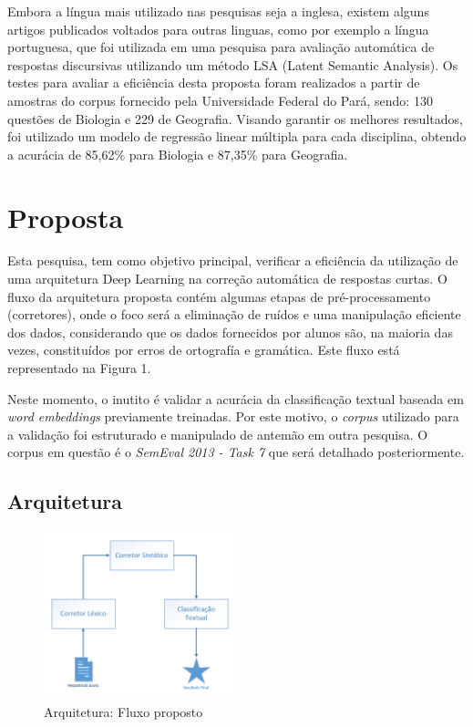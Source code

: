 \documentclass[conference]{IEEEtran}
\begin{document}
Embora a língua mais utilizado nas pesquisas seja a inglesa, existem alguns artigos publicados voltados para outras linguas, como por exemplo a língua portuguesa, que foi utilizada em uma pesquisa para avaliação automática de respostas discursivas  utilizando um método LSA (Latent Semantic Analysis)\cite{Sukkarieh:2009}. Os testes para avaliar a eficiência desta proposta foram realizados a partir de amostras do corpus fornecido pela Universidade Federal do Pará, sendo: 130 questões de Biologia e 229 de Geografia. Visando garantir os melhores resultados, foi utilizado um modelo de regressão linear múltipla para cada disciplina, obtendo a acurácia de 85,62\% para Biologia e 87,35\% para Geografia.

\section{Proposta}
Esta pesquisa, tem como objetivo principal, verificar a eficiência da utilização de uma arquitetura Deep Learning na correção automática de respostas curtas. O fluxo da arquitetura proposta contém algumas etapas de pré-processamento (corretores), onde o foco será a eliminação de ruídos e uma manipulação eficiente dos dados, considerando que os dados fornecidos por alunos são, na maioria das vezes, constituídos por erros de ortografía e gramática. Este fluxo está representado na Figura 1.

Neste momento, o inutito é validar a acurácia da classificação textual baseada em \textit{word embeddings} previamente treinadas. Por este motivo, o \textit{corpus} utilizado para a validação foi estruturado e manipulado de antemão em outra pesquisa. O corpus em questão é o \textit{SemEval 2013 - Task 7}\cite{Dzikovska:2013} que será detalhado posteriormente.


\subsection{Arquitetura}

\begin{figure}[h]
\centering
\includegraphics[width=0.5\textwidth]{arquitetura}
\caption{Arquitetura: Fluxo proposto}
\end{figure}
\end{document}
